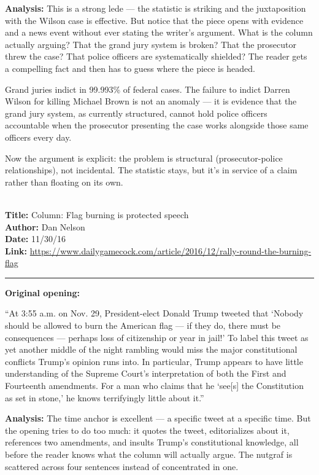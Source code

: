 \documentclass[12pt]{article}
\newcounter{examplenum}
\newcommand{\totalexamples}{10}
\newcommand{\exampleheader}[4]{%
    \newpage
    \stepcounter{examplenum}%
    \noindent{\large\bfseries\color{garnet} Example \theexamplenum\ of \totalexamples}\\[6pt]
    \textbf{Title:} #1\\
    \textbf{Author:} #2\\
    \textbf{Date:} #3\\
    \textbf{Link:} \url{#4}\\[4pt]
    \noindent\rule{\textwidth}{0.4pt}
    \vspace{6pt}
}
\begin{document}
\textbf{Analysis:} This is a strong lede --- the statistic is striking and the juxtaposition with the Wilson case is effective. But notice that the piece opens with evidence and a news event without ever stating the writer's argument. What is the column actually arguing? That the grand jury system is broken? That the prosecutor threw the case? That police officers are systematically shielded? The reader gets a compelling fact and then has to guess where the piece is headed.

\begin{seasonbox}
Grand juries indict in 99.993\% of federal cases. The failure to indict Darren Wilson for killing Michael Brown is not an anomaly --- it is evidence that the grand jury system, as currently structured, cannot hold police officers accountable when the prosecutor presenting the case works alongside those same officers every day.
\end{seasonbox}

Now the argument is explicit: the problem is structural (prosecutor-police relationships), not incidental. The statistic stays, but it's in service of a claim rather than floating on its own.

\exampleheader{Column: Flag burning is protected speech}{Dan Nelson}{11/30/16}{https://www.dailygamecock.com/article/2016/12/rally-round-the-burning-flag}

\begin{promptbox}
\textbf{Original opening:}

``At 3:55 a.m. on Nov. 29, President-elect Donald Trump tweeted that `Nobody should be allowed to burn the American flag --- if they do, there must be consequences --- perhaps loss of citizenship or year in jail!' To label this tweet as yet another middle of the night rambling would miss the major constitutional conflicts Trump's opinion runs into. In particular, Trump appears to have little understanding of the Supreme Court's interpretation of both the First and Fourteenth amendments. For a man who claims that he `see[s] the Constitution as set in stone,' he knows terrifyingly little about it.''
\end{promptbox}

\textbf{Analysis:} The time anchor is excellent --- a specific tweet at a specific time. But the opening tries to do too much: it quotes the tweet, editorializes about it, references two amendments, and insults Trump's constitutional knowledge, all before the reader knows what the column will actually argue. The nutgraf is scattered across four sentences instead of concentrated in one.
\end{document}
